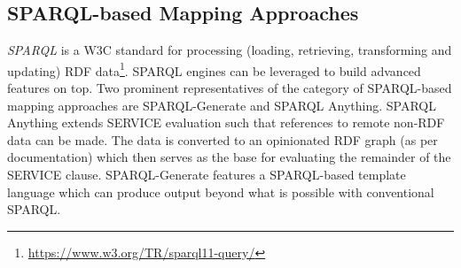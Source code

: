 \subsection{SPARQL-based Mapping Approaches}
\emph{SPARQL} is a W3C standard for processing (loading, retrieving, transforming and updating) RDF data\footnote{\url{https://www.w3.org/TR/sparql11-query/}}.
SPARQL engines can be leveraged to build advanced features on top.
Two prominent representatives of the category of SPARQL-based mapping approaches are SPARQL-Generate\cite{lefranccois2017sparqlgenerate} and SPARQL Anything\cite{10.1145/3555312sparqlanything}.
SPARQL Anything extends SERVICE evaluation such that references to remote non-RDF data can be made. The data is converted to an opinionated RDF graph (as per documentation) which then serves as the base for evaluating the remainder of the SERVICE clause.
SPARQL-Generate features a SPARQL-based template language which can produce output beyond what is possible with conventional SPARQL.

